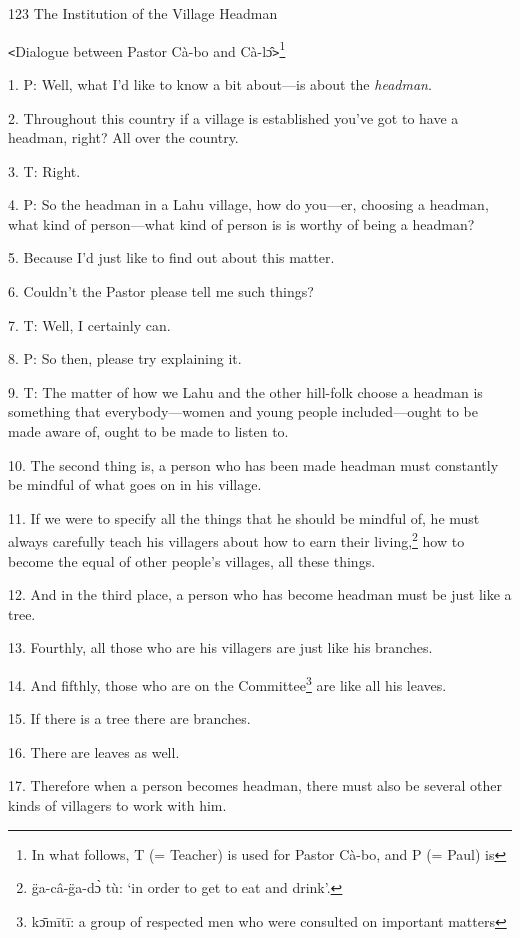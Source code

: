 
123 The Institution of the Village Headman

\texttt{<}Dialogue between Pastor Cà-bo and Cà-lɔ̂\texttt{>}\footnote{In what follows, T (= Teacher) is used for Pastor Cà-bo, and P (= Paul) is}

1. P: Well, what I'd like to know a bit about---is about the \textit{headman}.

2. Throughout this country if a village is established you've got to have a headman,
right? All over the country.

3. T: Right.

4. P: So the headman in a Lahu village, how do you---er, choosing a headman, what
kind of person---what kind of person is is worthy of being a headman?

5. Because I'd just like to find out about this matter.

6. Couldn't the Pastor please tell me such things?

7. T: Well, I certainly can.

8. P: So then, please try explaining it.

9. T: The matter of how we Lahu and the other hill-folk choose a headman is something
that everybody---women and young people included---ought to be made aware of, ought
to be made to listen to.

10. The second thing is, a person who has been made headman must constantly be
mindful of what goes on in his village.

11. If we were to specify all the things that he should be mindful of, he must
always carefully teach his villagers about how to earn their living,\footnote{g̈a-câ-g̈a-dɔ̀ tù: `in order to get to eat and drink'.} how to
become the equal of other people's villages, all these things.

12. And in the third place, a person who has become headman must be just like a
tree.

13. Fourthly, all those who are his villagers are just like his branches.

14. And fifthly, those who are on the Committee\footnote{kɔ̄mītī: a group of respected men who were consulted on important matters} are like all his leaves.

15. If there is a tree there are branches.

16. There are leaves as well.

17. Therefore when a person becomes headman, there must also be several other kinds
of villagers to work with him.

